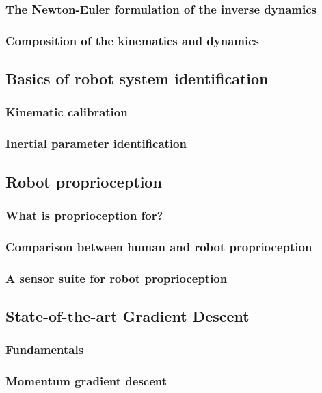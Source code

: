 \documentclass{article}
\begin{document}
\subsubsection{The Newton-Euler formulation of the inverse dynamics}
\subsubsection{Composition of the kinematics and dynamics}
\subsection{Basics of robot system identification}
\subsubsection{Kinematic calibration}
\subsubsection{Inertial parameter identification}
\subsection{Robot proprioception}
\subsubsection{What is proprioception for?}
\subsubsection{Comparison between human and robot proprioception}
\subsubsection{A sensor suite for robot proprioception}
\subsection{State-of-the-art Gradient Descent}
\subsubsection{Fundamentals}
\subsubsection{Momentum gradient descent}
\end{document}
